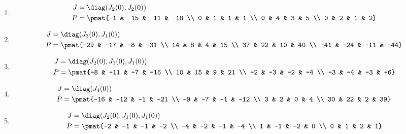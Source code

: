 \begin{enumerate}
\item

\begin{align*}
J &= \diag(J_{2}(0), J_{2}(0))\\
P &= \pmat{-1 & -15 & -11 & -18 \\ 0 & 1 & 1 & 1 \\ 0 & 4 & 3 & 5 \\ 0 & 2 & 1 & 2}
\end{align*}

\item

\begin{align*}
J &= \diag(J_{3}(0), J_{1}(0))\\
P &= \pmat{-29 & -17 & -8 & -31 \\ 14 & 8 & 4 & 15 \\ 37 & 22 & 10 & 40 \\ -41 & -24 & -11 & -44}
\end{align*}

\item

\begin{align*}
J &= \diag(J_{2}(0), J_{1}(0), J_{1}(0))\\
P &= \pmat{-8 & -11 & -7 & -16 \\ 10 & 15 & 9 & 21 \\ -2 & -3 & -2 & -4 \\ -3 & -4 & -3 & -6}
\end{align*}

\item

\begin{align*}
J &= \diag(J_{4}(0))\\
P &= \pmat{-16 & -12 & -1 & -21 \\ -9 & -7 & -1 & -12 \\ 3 & 2 & 0 & 4 \\ 30 & 22 & 2 & 39}
\end{align*}

\item

\begin{align*}
J &= \diag(J_{2}(0), J_{1}(0), J_{1}(0))\\
P &= \pmat{-2 & -1 & -1 & -2 \\ -4 & -2 & -1 & -4 \\ 1 & -1 & -2 & 0 \\ 0 & 1 & 2 & 1}
\end{align*}


\end{enumerate}
